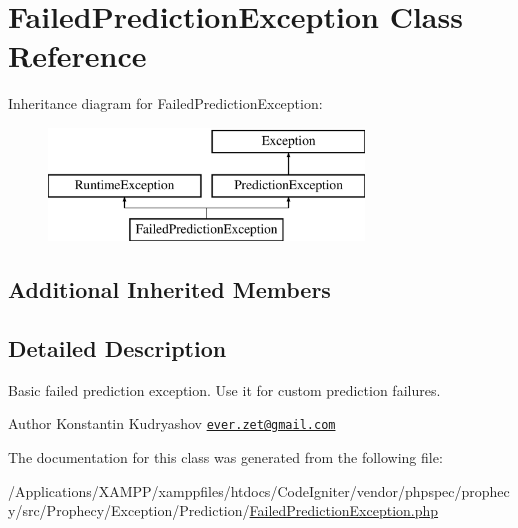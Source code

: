 \hypertarget{class_prophecy_1_1_exception_1_1_prediction_1_1_failed_prediction_exception}{}\section{Failed\+Prediction\+Exception Class Reference}
\label{class_prophecy_1_1_exception_1_1_prediction_1_1_failed_prediction_exception}
Inheritance diagram for Failed\+Prediction\+Exception\+:\begin{figure}[H]
\begin{center}
\leavevmode
\includegraphics[height=3.000000cm]{class_prophecy_1_1_exception_1_1_prediction_1_1_failed_prediction_exception}
\end{center}
\end{figure}
\subsection*{Additional Inherited Members}


\subsection{Detailed Description}
Basic failed prediction exception. Use it for custom prediction failures.

\begin{DoxyAuthor}{Author}
Konstantin Kudryashov \href{mailto:ever.zet@gmail.com}{\tt ever.\+zet@gmail.\+com} 
\end{DoxyAuthor}


The documentation for this class was generated from the following file\+:\begin{DoxyCompactItemize}
\item 
/\+Applications/\+X\+A\+M\+P\+P/xamppfiles/htdocs/\+Code\+Igniter/vendor/phpspec/prophecy/src/\+Prophecy/\+Exception/\+Prediction/\mbox{\hyperlink{_failed_prediction_exception_8php}{Failed\+Prediction\+Exception.\+php}}\end{DoxyCompactItemize}
